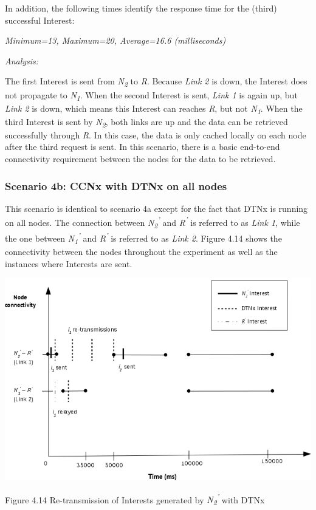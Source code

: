 \documentclass[a4paper,12pt]{report}      %
\begin{document}
In addition, the following times identify the response time for the (third) successful Interest:

\begin{center}\textsl{Minimum=13, Maximum=20, Average=16.6 (milliseconds)}\end{center}

\vspace*{1\baselineskip}\noindent\emph{Analysis:}

The first Interest is sent from \emph{N\textsubscript{2}} to \emph{R}. Because \emph{Link 2} is down, the Interest does not propagate
to \emph{N\textsubscript{1}}. When the second Interest is sent, \emph{Link 1} is again up, but \emph{Link 2} is down, which means this Interest can reaches \emph{R}, but not \emph{N\textsubscript{1}}. When the third Interest is sent by \emph{N\textsubscript{2}}, both links are up and the data can be retrieved successfully through \emph{R}. In this case, the data is only cached locally on each node after the third request is sent. In this scenario, there is a basic end-to-end connectivity requirement between the nodes for the data to be retrieved.

\subsubsection{Scenario 4b: CCNx with DTNx on all nodes}

This scenario is identical to scenario 4a except for the fact that DTNx is running on all nodes. The connection between \emph{N\textsubscript{2}\textsuperscript{'}} and \emph{R\textsuperscript{'}} is referred to as \emph{Link 1}, while the one between \emph{N\textsubscript{1}\textsuperscript{'}} and \emph{R\textsuperscript{'}} is referred to as \emph{Link 2}. Figure 4.14 shows the connectivity between the nodes throughout the experiment as well as the instances where Interests are sent.

\noindent\includegraphics[scale=0.55]{exp4b_timediag.jpg}\newline
\begin{center}Figure 4.14 Re-transmission of Interests generated by \emph{N\textsubscript{2}\textsuperscript{'}} with DTNx\end{center} 
\end{document}
